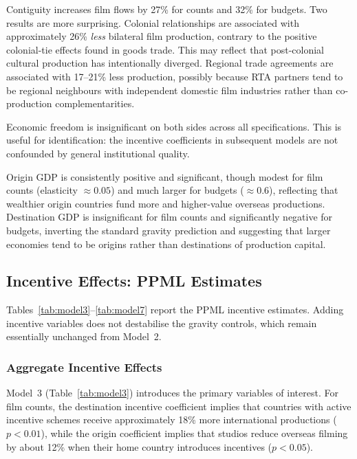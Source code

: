 Contiguity increases film flows by 27\% for counts and 32\% for budgets. Two results are more surprising. Colonial relationships are associated with approximately 26\% \textit{less} bilateral film production, contrary to the positive colonial-tie effects found in goods trade. This may reflect that post-colonial cultural production has intentionally diverged. Regional trade agreements are associated with 17--21\% less production, possibly because RTA partners tend to be regional neighbours with independent domestic film industries rather than co-production complementarities.

Economic freedom is insignificant on both sides across all specifications. This is useful for identification: the incentive coefficients in subsequent models are not confounded by general institutional quality.

Origin GDP is consistently positive and significant, though modest for film counts (elasticity $\approx 0.05$) and much larger for budgets ($\approx 0.6$), reflecting that wealthier origin countries fund more and higher-value overseas productions. Destination GDP is insignificant for film counts and significantly negative for budgets, inverting the standard gravity prediction and suggesting that larger economies tend to be origins rather than destinations of production capital.

\subsection{Incentive Effects: PPML Estimates}
\label{sec:ppml_incentives}

Tables~\ref{tab:model3}--\ref{tab:model7} report the PPML incentive estimates. Adding incentive variables does not destabilise the gravity controls, which remain essentially unchanged from Model~2.

\subsubsection{Aggregate Incentive Effects}

Model~3 (Table~\ref{tab:model3}) introduces the primary variables of interest. For film counts, the destination incentive coefficient implies that countries with active incentive schemes receive approximately 18\% more international productions ($p < 0.01$), while the origin coefficient implies that studios reduce overseas filming by about 12\% when their home country introduces incentives ($p < 0.05$).


